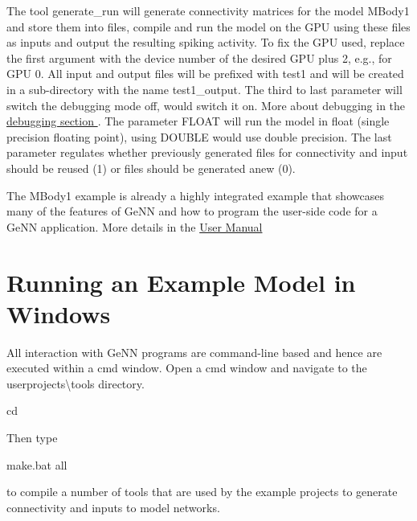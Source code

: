 The tool generate\+\_\+run will generate connectivity matrices for the model {\ttfamily M\+Body1} and store them into files, compile and run the model on the G\+P\+U using these files as inputs and output the resulting spiking activity. To fix the G\+P\+U used, replace the first argument {} with the device number of the desired G\+P\+U plus 2, e.\+g., {} for G\+P\+U 0. All input and output files will be prefixed with {\ttfamily test1} and will be created in a sub-\/directory with the name {\ttfamily test1\+\_\+output}. The third to last parameter {} will switch the debugging mode off, {} would switch it on. More about debugging in the \hyperlink{}{debugging section }. The parameter {\ttfamily F\+L\+O\+A\+T} will run the model in float (single precision floating point), using {\ttfamily D\+O\+U\+B\+L\+E} would use double precision. The last parameter regulates whether previously generated files for connectivity and input should be reused (1) or files should be generated anew (0).

The M\+Body1 example is already a highly integrated example that showcases many of the features of Ge\+N\+N and how to program the user-\/side code for a Ge\+N\+N application. More details in the \hyperlink{UserManual}{User Manual }\hypertarget{Quickstart_windows_quick}{}\section{Running an Example Model in Windows}\label{Quickstart_windows_quick}
All interaction with Ge\+N\+N programs are command-\/line based and hence are executed within a {\ttfamily cmd} window. Open a {\ttfamily cmd} window and navigate to the {\ttfamily userprojects\textbackslash{}tools} directory. 
\begin{DoxyCode}
cd %
\end{DoxyCode}
 Then type 
\begin{DoxyCode}
make.bat all
\end{DoxyCode}
 to compile a number of tools that are used by the example projects to generate connectivity and inputs to model networks.

